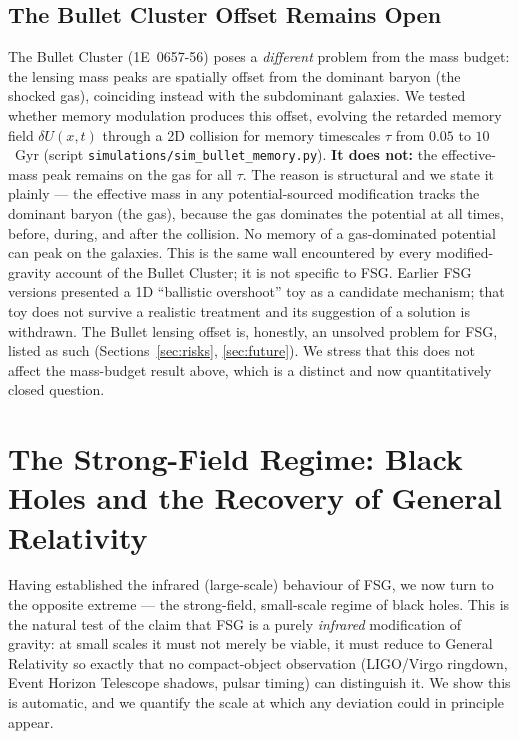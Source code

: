 \documentclass[11pt,a4paper]{article}
\begin{document}
\begin{onehalfspacing}
\subsection{The Bullet Cluster Offset Remains Open}
The Bullet Cluster (1E~0657-56) poses a \emph{different} problem from the mass budget: the lensing mass peaks are spatially offset from the dominant baryon (the shocked gas), coinciding instead with the subdominant galaxies. We tested whether memory modulation produces this offset, evolving the retarded memory field $\delta U(x,t)$ through a 2D collision for memory timescales $\tau$ from $0.05$ to $10$~Gyr (script \texttt{simulations/sim\_bullet\_memory.py}). \textbf{It does not:} the effective-mass peak remains on the gas for all $\tau$. The reason is structural and we state it plainly --- the effective mass in any potential-sourced modification tracks the dominant baryon (the gas), because the gas dominates the potential at all times, before, during, and after the collision. No memory of a gas-dominated potential can peak on the galaxies.
This is the same wall encountered by every modified-gravity account of the Bullet Cluster; it is not specific to FSG. Earlier FSG versions presented a 1D ``ballistic overshoot'' toy as a candidate mechanism; that toy does not survive a realistic treatment and its suggestion of a solution is withdrawn. The Bullet lensing offset is, honestly, an unsolved problem for FSG, listed as such (Sections~\ref{sec:risks}, \ref{sec:future}). We stress that this does not affect the mass-budget result above, which is a distinct and now quantitatively closed question.

\newpage
\section{The Strong-Field Regime: Black Holes and the Recovery of General Relativity}
\label{sec:strongfield}
Having established the infrared (large-scale) behaviour of FSG, we now turn to the opposite extreme --- the strong-field, small-scale regime of black holes. This is the natural test of the claim that FSG is a purely \emph{infrared} modification of gravity: at small scales it must not merely be viable, it must reduce to General Relativity so exactly that no compact-object observation (LIGO/Virgo ringdown, Event Horizon Telescope shadows, pulsar timing) can distinguish it. We show this is automatic, and we quantify the scale at which any deviation could in principle appear.

\end{onehalfspacing}
\end{document}
